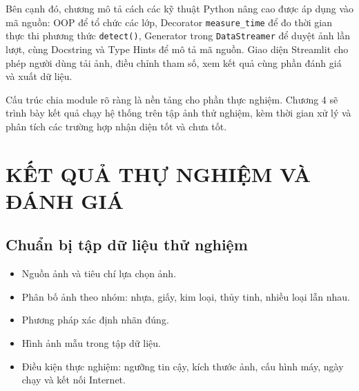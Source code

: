 \documentclass[a4paper,13pt]{extarticle}
\begin{document}
Bên cạnh đó, chương mô tả cách các kỹ thuật Python nâng cao được áp dụng vào mã nguồn: OOP để tổ chức các lớp, Decorator \texttt{measure\_time} để đo thời gian thực thi phương thức \texttt{detect()}, Generator trong \texttt{DataStreamer} để duyệt ảnh lần lượt, cùng Docstring và Type Hints để mô tả mã nguồn. Giao diện Streamlit cho phép người dùng tải ảnh, điều chỉnh tham số, xem kết quả cùng phần đánh giá và xuất dữ liệu.

Cấu trúc chia module rõ ràng là nền tảng cho phần thực nghiệm. Chương 4 sẽ trình bày kết quả chạy hệ thống trên tập ảnh thử nghiệm, kèm thời gian xử lý và phân tích các trường hợp nhận diện tốt và chưa tốt.

\section{ KẾT QUẢ THỰ NGHIỆM VÀ ĐÁNH GIÁ}

\subsection{ Chuẩn bị tập dữ liệu thử nghiệm}
\begin{itemize}
    \item Nguồn ảnh và tiêu chí lựa chọn ảnh.
    \item Phân bố ảnh theo nhóm: nhựa, giấy, kim loại, thủy tinh, nhiều loại lẫn nhau.
    \item Phương pháp xác định nhãn đúng.
    \item Hình ảnh mẫu trong tập dữ liệu.
    \item Điều kiện thực nghiệm: ngưỡng tin cậy, kích thước ảnh, cấu hình máy, ngày chạy và kết nối Internet.
\end{itemize}
\end{document}
